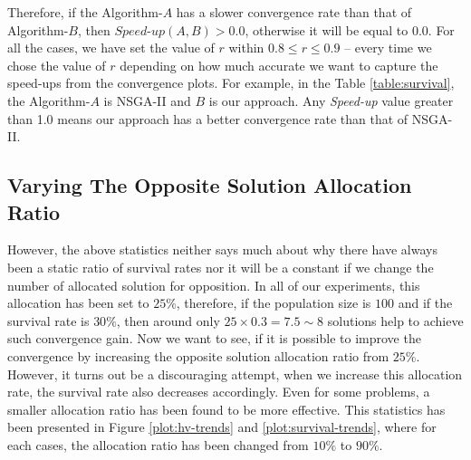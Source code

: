 \documentclass{sig-alternate-05-2015}
\begin{document}
Therefore, if the Algorithm-\(A\) has a slower convergence rate than that of Algorithm-\(B\), then \(\textit{Speed-up}(A,B) > 0.0\), otherwise it will be equal to 0.0. For all the cases, we have set the value of \(r\) within \(0.8 \le r \le 0.9\) -- every time we chose the value of \(r\) depending on how much accurate we want to capture the speed-ups from the convergence plots. For example, in the Table \ref{table:survival}, the Algorithm-\(A\) is NSGA-II and \(B\) is our approach. Any \textit{Speed-up} value greater than 1.0 means our approach has a better convergence rate than that of NSGA-II.

%
\begin{figure*}[!htp]
	\centering
	\hfill
	\caption{These plots illustrates the mean-static survival-rates for 2 and 3-objective problems, with varying rates for opposite point allocation ratio. In both cases we can see that the rate of survival decreases with increase in the allocation ratio.}
	\label{plot:survival-trends}
\end{figure*}
%
%
\begin{figure*}[!hbp]
	\centering
	\hfill
	\caption{This figure illustrates the ``hit-and-spread'' nature of the single pivot point case. This plot demonstrated a scenario for ZDT4 problem, here we can clearly see trajectory of the optimization procedure.}
	\label{plot:hit-n-spread}
\end{figure*}
%
\subsection{Varying The Opposite Solution Allocation Ratio}
\label{subsec:op-ratio}
However, the above statistics neither says much about why there have always been a static ratio of survival rates nor it will be a constant if we change the number of allocated solution for opposition. In all of our experiments, this allocation has been set to \(25\%\), therefore, if the population size is \(100\) and if the survival rate is \(30\%\), then around only \(25 \times 0.3 = 7.5 \sim 8\) solutions help to achieve such convergence gain. Now we want to see, if it is possible to improve the convergence by increasing the opposite solution allocation ratio from \(25\%\). However, it turns out be a discouraging attempt, when we increase this allocation rate, the survival rate also decreases accordingly. Even for some problems, a smaller allocation ratio has been found to be more effective. This statistics has been presented in Figure \ref{plot:hv-trends} and \ref{plot:survival-trends}, where for each cases, the allocation ratio has been changed from \(10\%\) to \(90\%\).
\end{document}
